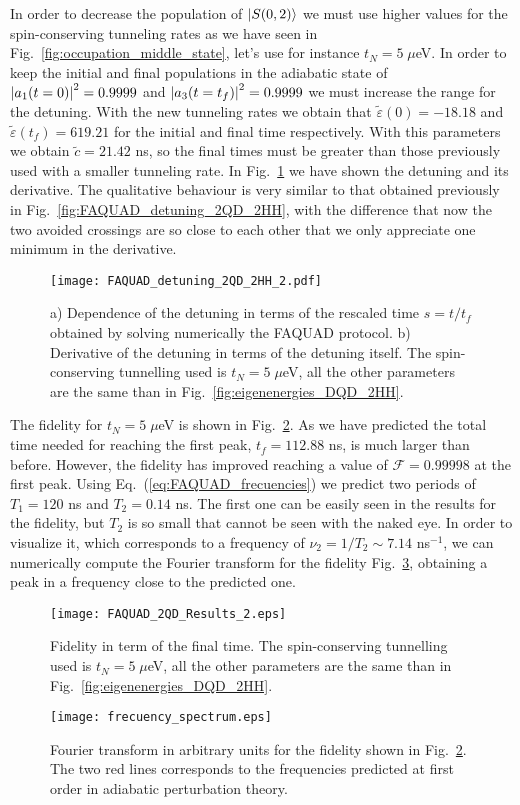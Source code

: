 In order to decrease the population of $\ket{S(0,2)}$ we must use higher values for the spin-conserving tunneling rates as we have seen in Fig.~\ref{fig:occupation_middle_state}, let's use for instance $t_N=5\; \mu$eV. In order to keep the initial and final populations in the adiabatic state of $\abs{a_1(t=0)}^2=0.9999$ and $\abs{a_3(t=t_f)}^2=0.9999$ we must increase the range for the detuning. With the new tunneling rates we obtain that $\tilde{\varepsilon}(0)=-18.18$ and $\tilde{\varepsilon}(t_f)=619.21$ for the initial and final time respectively. With this parameters we obtain $\tilde{c}=21.42$ ns, so the final times must be greater than those previously used with a smaller tunneling rate. In Fig.~\ref{fig:FAQUAD_detuning_2QD_2HH_2} we have shown the detuning and its derivative. The qualitative behaviour is very similar to that obtained previously in Fig.~\ref{fig:FAQUAD_detuning_2QD_2HH}, with the difference that now the two avoided crossings are so close to each other that we only appreciate one minimum in the derivative.
\begin{figure}[!htb]
	\centering
	\texttt{[image: FAQUAD\_detuning\_2QD\_2HH\_2.pdf]}
	\caption{a) Dependence of the detuning in terms of the rescaled time $s=t/t_f$ obtained by solving numerically the FAQUAD protocol. b) Derivative of the detuning in terms of the detuning itself. The spin-conserving tunnelling used is $t_N=5\; \mu$eV, all the other parameters are the same than in Fig.~\ref{fig:eigenenergies_DQD_2HH}.}
	\label{fig:FAQUAD_detuning_2QD_2HH_2}
\end{figure}

The fidelity for $t_N=5 \; \mu$eV is shown in Fig.~\ref{fig:FAQUAD_2QD_Results_2}. As we have predicted the total time needed for reaching the first peak, $t_f=112.88$ ns, is much larger than before. However, the fidelity has improved reaching a value of $\mathcal{F}=0.99998$ at the first peak. Using Eq.~(\ref{eq:FAQUAD_frecuencies}) we predict two periods of $T_1=120$ ns and $T_2=0.14$ ns. The first one can be easily seen in the results for the fidelity, but $T_2$ is so small that cannot be seen with the naked eye. In order to visualize it, which corresponds to a frequency of $\nu_2=1/T_2\sim 7.14$ ns$^{-1}$, we can numerically compute the Fourier transform for the fidelity Fig.~\ref{fig:frecuency_spectrum}, obtaining a peak in a frequency close to the predicted one.
\begin{figure}[!htb]
	\centering
	\texttt{[image: FAQUAD\_2QD\_Results\_2.eps]}
	\caption{Fidelity in term of the final time. The spin-conserving tunnelling used is $t_N=5\; \mu$eV, all the other parameters are the same than in Fig.~\ref{fig:eigenenergies_DQD_2HH}.}
	\label{fig:FAQUAD_2QD_Results_2}
\end{figure}
\begin{figure}[!htb]
	\centering
	\texttt{[image: frecuency\_spectrum.eps]}
	\caption{Fourier transform in arbitrary units for the fidelity shown in Fig.~\ref{fig:FAQUAD_2QD_Results_2}. The two red lines corresponds to the frequencies predicted at first order in adiabatic perturbation theory.}
	\label{fig:frecuency_spectrum}
\end{figure}

